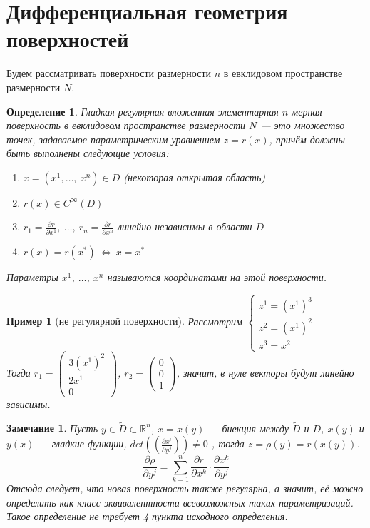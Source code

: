 \documentclass[12pt]{article}
\theoremstyle{plain}
\newtheorem{example}{Пример}
\newtheorem{definition}{Определение}[section]
\newtheorem{remark}{Замечание}
\newcommand{\R}{\mathbb R}
\begin{document}
    \section{Дифференциальная геометрия поверхностей}
    Будем рассматривать поверхности размерности $n$ в евклидовом пространстве размерности $N$.
    \begin{definition}
        Гладкая регулярная вложенная элементарная $n$-мерная поверхность в евклидовом пространстве размерности $N$ --- это множество точек, задаваемое параметрическим уравнением $z=r(x)$, причём должны быть выполнены следующие условия:
        \begin{enumerate}
            \item $x=(x^1, \ldots, \ x^n)\in D$ (некоторая открытая область)
            \item $r(x)\in C^{\infty}(D)$
            \item $r_1=\frac{\partial r}{\partial x^1}, \ \ldots, \ r_n=\frac{\partial r}{\partial x^n}$ линейно независимы в области $D$
            \item $r(x)=r(x^*) \ \Longleftrightarrow \ x=x^*$
        \end{enumerate}
        Параметры $x^1$, $\ldots$, $x^n$ называются координатами на этой поверхности.
    \end{definition}
    \begin{example}[не регулярной поверхности]
        Рассмотрим $\begin{cases}
            z^1=(x^1)^3\\
            z^2=(x^1)^2\\
            z^3=x^2
        \end{cases}$\\
        Тогда $r_1=\begin{pmatrix}
            3(x^1)^2\\
            2x^1\\
            0
        \end{pmatrix}$, $r_2=\begin{pmatrix}
            0\\
            0\\
            1
        \end{pmatrix}$, значит, в нуле векторы будут линейно зависимы.
    \end{example}
    \begin{remark}
        Пусть $y\in\tilde{D}\subset\R^n$, $x=x(y)$ --- биекция между $\tilde{D}$ и $D$, $x(y)$ и $y(x)$ --- гладкие функции, $det\left(\left(\frac{\partial x^i}{\partial y^j}\right)\right)\neq0$ , тогда $z=\rho(y)=r(x(y))$.
        $$\frac{\partial\rho}{\partial y^j}=\sum\limits_{k=1}^n\frac{\partial r}{\partial x^k}\cdot\frac{\partial x^k}{\partial y^j}$$
        Отсюда следует, что новая поверхность также регулярна, а значит, её можно определить как класс эквивалентности всевозможных таких параметризаций. Такое определение не требует 4 пункта исходного определения.
    \end{remark}
\end{document}
